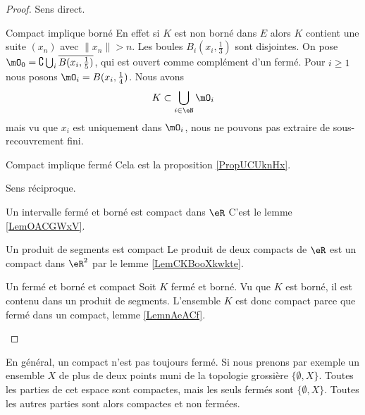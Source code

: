 \begin{proof}
    Sens direct.
    \begin{subproof}
    \item[Compact implique borné]
        En effet si \( K\) est non borné dans \( E\) alors \( K\) contient une suite \( (x_n)\) avec \( \| x_n \|>n\). Les boules \( B_i(x_i,\frac{ 1 }{3})\) sont disjointes. On pose \( \mO_0=\complement\bigcup_i\overline{ B(x_i,\frac{1}{ 5 }) }\), qui est ouvert comme complément d'un fermé. Pour \( i\geq 1\) nous posons \( \mO_i=B(x_i,\frac{1}{ 4 })\). Nous avons
        \begin{equation}
            K\subset\bigcup_{i\in \eN}\mO_i
        \end{equation}
        mais vu que \( x_i\) est uniquement dans \( \mO_i\), nous ne pouvons pas extraire de sous-recouvrement fini.
    \item[Compact implique fermé]
        Cela est la proposition \ref{PropUCUknHx}.
    \end{subproof}
    Sens réciproque.
    \begin{subproof}
    \item[Un intervalle fermé et borné est compact dans \( \eR\)]
        C'est le lemme \ref{LemOACGWxV}.
    \item[Un produit de segments est compact]
        Le produit de deux compacts de \( \eR\) est un compact dans \( \eR^2\) par le lemme \ref{LemCKBooXkwkte}.
    \item[Un fermé et borné et compact]
        Soit \( K\) fermé et borné. Vu que \( K\) est borné, il est contenu dans un produit de segments. L'ensemble \( K\) est donc compact parce que fermé dans un compact, lemme \ref{LemnAeACf}.
    \end{subproof}
\end{proof}

\begin{example}
    En général, un compact n'est pas toujours fermé. Si nous prenons par exemple un ensemble \( X\) de plus de deux points muni de la topologie grossière \( \{ \emptyset,X \}\). Toutes les parties de cet espace sont compactes, mais les seuls fermés sont \( \{ \emptyset,X \}\). Toutes les autres parties sont alors compactes et non fermées.
\end{example}

